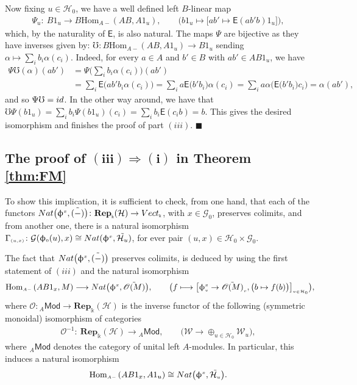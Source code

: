 \documentclass[11pt]{article}
\numberwithin{equation}{section}
\newcommand{\Sf}[1]{\mathsf{#1}}
\newcommand{\lmod}[1]{{}_{#1}\Sf{Mod}}
\renewcommand{\hom}[3]{\mathrm{Hom}_{\Sscript{#1}}\left(#2, #3\right)}
\newcommand{\Rep}[1]{\mathbf{Rep}_{\Sscript{\Bbbk}}(#1)}
\newcommand{\Vect}{{\rm Vect}_{\Sscript{\Bbbk}}}
\newcommand{\Go}{\cG_{\Sscript{0}}}
\newcommand{\Ho}{\cH_{\Sscript{0}}}
\newcommand{\Wu}{\cW_{\Sscript{u}}}
\newcommand{\oO}{\mathscr{O}}
\newcommand{\cG}{{\mathcal G}}
\newcommand{\cH}{{\mathcal H}}
\newcommand{\cW}{{\mathcal W}}
\newcommand{\Sscript}[1]{\scriptscriptstyle{#1}}
\newcommand{\phio}{\upphi_{\Sscript{0}}}
\newcommand*{\QEDA}{\hfill\ensuremath{\blacksquare}}%
\begin{document}
Now fixing $u \in \Ho$, we have a well defined left $B$-linear map
\begin{gather*}
\Psi_{u}\colon \ B1_{u} \longrightarrow B\hom{A-}{AB}{A1_{u}}, \qquad \big( b1_{u} \longmapsto \big[ ab' \mapsto \Sf{E}(ab'b) 1_{u} \big] \big),
\end{gather*}
which, by the naturality of $\Sf{E}$, is also natural. The maps $\Psi$ are bijective as they have inverses given by: $\mho\colon B\hom{A-}{AB}{A1_{u}} \to B1_{u}$ sending $\alpha \mapsto \sum_{i}b_{i}\alpha(c_{i})$. Indeed, for every $a \in A$ and $b' \in B$ with $ab' \in AB1_{u}$, we have
\begin{align*}
\Psi\mho(\alpha) (ab') &= \Psi\bigg( \sum_{i} b_{i}\alpha(c_{i})\bigg) (ab') \\
&= \sum_{i} \Sf{E}\big( ab'b_{i}\alpha(c_{i})\big) = \sum_{i} a \Sf{E}\big(b'b_{i}\big)\alpha(c_{i}) = \sum_{i} a \alpha\big( \Sf{E}\big( b'b_{i}\big)c_{i}\big) = \alpha(ab'),
\end{align*}
and so $\Psi\mho={\rm id}$. In the other way around, we have that $\mho \Psi(b1_{u}) = \sum_{i}b_{i}\Psi(b1_{u})(c_{i}) = \sum_{i} b_{i}\Sf{E}(c_{i}b) = b$. This gives the desired isomorphism and finishes the proof of part $(iii)$. \QEDA

\subsection[The proof of $(iii) \Rightarrow (i)$ in Theorem \ref{thm:FM}]{The proof of $\boldsymbol{(iii) \Rightarrow (i)}$ in Theorem \ref{thm:FM}}\label{sssec:III-IV}
To show this implication, it is sufficient to check, from one hand, that each of the functors ${\rm Nat}\big(\upphi^{\Sscript{x}}, \tilde{(-)}\big)\colon \Rep{\cH} \to \Vect$, with $x \in \Go$, preserves colimits, and from another one, there is a natural isomorphism $\Gamma_{\Sscript{(u, x)}}\colon \cG(\phio(u), x) \cong {\rm Nat}(\upphi^{\Sscript{x}}, \tilde{\cH_{u}})$, for ever pair $(u, x) \in \Ho \times \Go$.

The fact that ${\rm Nat}\big(\upphi^{\Sscript{x}}, \tilde{(-)}\big)$ preserves colimits, is deduced by using the first statement of $(iii)$ and the natural isomorphism
\begin{gather}\label{Eq:Calentaminetoglobal}
\hom{A-}{AB1_{x}}{M} \longrightarrow {\rm Nat}\big(\upphi^{\Sscript{x}}, \tilde{\oO(M)}\big),\qquad \big( f \longmapsto \big[ \upphi^{\Sscript{x}}_{\Sscript{v}} \to \tilde{\oO(M)}_{\Sscript{v}}, \big( b \mapsto f(b)
\big)\big]_{\Sscript{v \in \Ho}} \big),\!\!\!
\end{gather}
where $\oO\colon \lmod{A} \to \Rep{\cH}$ is the inverse functor of the following (symmetric monoidal) isomorphism of categories
\begin{gather*}
\oO^{-1}\colon \ \Rep{\cH} \longrightarrow \lmod{A}, \qquad \big( \cW \longrightarrow \oplus_{u \in \Ho} \Wu \big),
\end{gather*}
where $\lmod{A}$ denotes the category of unital left $A$-modules. In particular, this induces a natural isomorphism
\begin{gather*}
\hom{A-}{AB1_{x}}{A1_{u}} \cong {\rm Nat}\big(\upphi^{\Sscript{x}}, \tilde{\cH_{\Sscript{u}}}\big).
\end{gather*}
\end{document}
